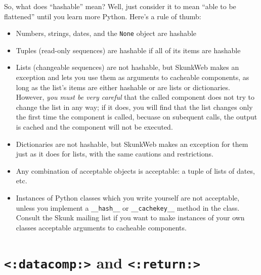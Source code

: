 \documentclass{manual}
\begin{document}
{{So, what does ``hashable'' mean? Well, just consider it 
to mean ``able to be flattened'' until you learn more Python. 
Here's a rule of thumb:

\begin{itemize}
\item Numbers, strings, dates, and the \texttt{None} object are hashable
\item Tuples (read-only sequences) are hashable if all of its items are hashable
\item Lists (changeable sequences) are not hashable, but SkunkWeb makes
an exception and lets you use them as arguments to cacheable 
components, as long as the list's items are either hashable or
are lists or dictionaries. However, \emph{you must be very careful} that the called
component does not try to change the list in any way; if it does,
you will find that the list changes only the first time the component
is called, becuase on subequent calls, the output is cached and the 
component will not be executed.

\item Dictionaries are not hashable, but SkunkWeb makes an exception for them
just as it does for lists, with the same cautions and restrictions.

\item Any combination of acceptable objects is acceptable: 
a tuple of lists of dates, etc.

\item Instances of Python classes which you write yourself are not
acceptable, unless you implement a \texttt{__hash__} or \texttt{__cachekey__}
method in the class. Consult the Skunk mailing list if you want
to make instances of your own classes acceptable arguments to 
cacheable components.

\end{itemize}





\section{\texttt{<:datacomp:>} and \texttt{<:return:>}}
\label{tagdatacomp}

}}
\end{document}
